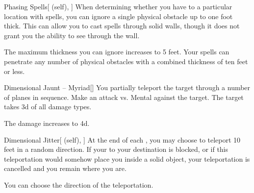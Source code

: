 \lowercase{\hypertarget{spell:Phasing Spells}{}}\label{spell:Phasing Spells}
\begin{attuneability}[Rank 4]{\hypertarget{spell:Phasing Spells}{Phasing Spells}}[ (self), ]
When determining whether you have  to a particular location with spells, you can ignore a single physical obstacle up to one foot thick.
This can allow you to cast spells through solid walls, though it does not grant you the ability to see through the wall.

\rankline
{} The maximum thickness you can ignore increases to 5 feet.
 Your spells can penetrate any number of physical obstacles with a combined thickness of ten feet or less.

\end{attuneability}
\vspace{0.25em}



\lowercase{\hypertarget{spell:Dimensional Jaunt -- Myriad}{}}\label{spell:Dimensional Jaunt -- Myriad}
\begin{freeability}[Rank 5]{\hypertarget{spell:Dimensional Jaunt -- Myriad}{Dimensional Jaunt -- Myriad}}[]
You partially teleport the target through a number of planes in sequence.
Make an attack vs. Mental against the target.
\hit The target takes  \plus3d of all damage types.

\rankline
{} The damage increases to  \plus4d.

\end{freeability}
\vspace{0.25em}



\lowercase{\hypertarget{spell:Dimensional Jitter}{}}\label{spell:Dimensional Jitter}
\begin{attuneability}[Rank 5]{\hypertarget{spell:Dimensional Jitter}{Dimensional Jitter}}[ (self), ]
At the end of each , you may choose to teleport 10 feet in a random direction.
If your  to your destination is blocked, or if this teleportation would somehow place you inside a solid object, your teleportation is cancelled and you remain where you are.

\rankline
{} You can choose the direction of the teleportation.

\end{attuneability}
\vspace{0.25em}



